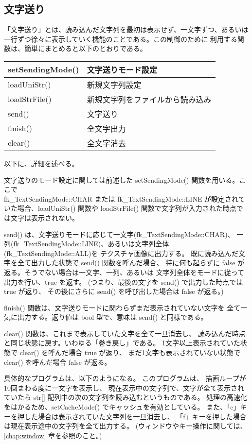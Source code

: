 \subsection{文字送り} \label{subsec:textSending}
「文字送り」とは、読み込んだ文字列を最初は表示せず、一文字ずつ、あるいは
一行ずつ徐々に表示していく機能のことである。この制御のために
利用する関数は、簡単にまとめると以下のとおりである。
\begin{center}
\begin{tabular}{|l|l|}
\hline
setSendingMode() & 文字送りモード設定 \\ \hline
loadUniStr() & 新規文字列設定 \\ \hline
loadStrFile() & 新規文字列をファイルから読み込み \\ \hline
send() & 文字送り \\ \hline
finish() & 全文字出力 \\ \hline
clear() & 全文字消去 \\ \hline
\end{tabular}
\end{center}
以下に、詳細を述べる。

文字送りのモード設定に関しては前述した setSendingMode() 関数を用いる。ここで \\
fk\_TextSendingMode::CHAR または
fk\_TextSendingMode::LINE が設定されていた場合、loadUniStr() 関数や
loadStrFile() 関数で文字列が入力された時点では文字は表示されない。

send() は、文字送りモードに応じて一文字(fk\_TextSendingMode::CHAR)、
一列(fk\_TextSendingMode::LINE)、あるいは文字列全体(fk\_TextSendingMode::ALL)を
テクスチャ画像に出力する。
既に読み込んだ文字を全て出力した状態で send() 関数を呼んだ場合、
特に何も起らずに false が返る。そうでない場合は一文字、一列、あるいは
文字列全体をモードに従って出力を行い、true を返す。
(つまり、最後の文字を send() で出力した時点では true が返り、
その後にさらに send() を呼び出した場合は false が返る。)

finish() 関数は、文字送りモードに関わらずまだ表示されていない文字を
全て一気に出力する。返り値は bool 型で、意味は send() と同様である。

clear() 関数は、これまで表示していた文字を全て一旦消去し、
読み込んだ時点と同じ状態に戻す。いわゆる「巻き戻し」である。
1文字以上表示されていた状態で clear() を呼んだ場合 true が返り、
まだ1文字も表示されていない状態で clear() を呼んだ場合 false が返る。

具体的なプログラムは、以下のようになる。
このプログラムは、
描画ループが10回まわる度に一文字を表示し、
現在表示中の文字列で、文字が全て表示されていたら
str[] 配列中の次の文字列を読み込むというものである。
処理の高速化をはかるため、setCacheMode() でキャッシュを有効としている。
また、「c」キーを押した場合は表示されていた文字列を一旦消去し、
「f」キーを押した場合は現在表示途中の文字列を全て出力する。
(ウィンドウやキー操作に関しては、\ref{chap:window} 章を参照のこと。) \\

